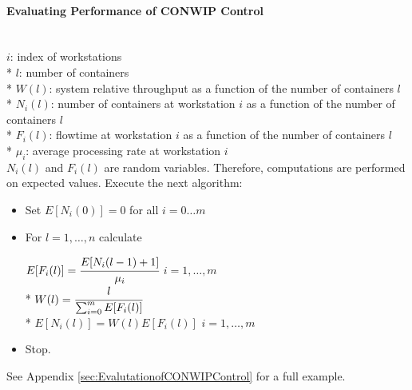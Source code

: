 \documentclass[12pt]{article}
\begin{document}
\paragraph{Evaluating Performance of CONWIP Control}\mbox{}\\
$i$: index of workstations\\*
$l$: number of containers\\*
$W(l)$: system relative throughput as a function of the number of containers $l$\\*
$N_i(l)$: number of containers at workstation $i$ as a function of the number of containers $l$\\*
$F_i(l)$: flowtime at workstation $i$ as a function of the number of containers $l$\\*
$\mu_i$: average processing rate at workstation $i$\\
$N_i(l)$ and $F_i(l)$ are random variables. Therefore, computations are performed on expected values. Execute the next algorithm:
\begin{itemize}
\item Set $E[N_i(0)] = 0$ for all $i = 0 \dots m$
\item For $l = 1, \dots, n$ calculate
\begin{center}
$E[F_i(l)] = \cfrac{E[N_i(l-1) + 1]}{\mu_i}$ $i = 1, \dots, m$\\*
$W(l) = \cfrac{l}{\sum_{i=0}^{m}E[F_i(l)]}$\\*
$E[N_i(l)] = W(l)E[F_i(l)]$ $i = 1, \dots, m$
\end{center}
\item Stop.
\end{itemize}
See Appendix \ref{sec:EvalutationofCONWIPControl} for a full example.
\clearpage
\end{document}
